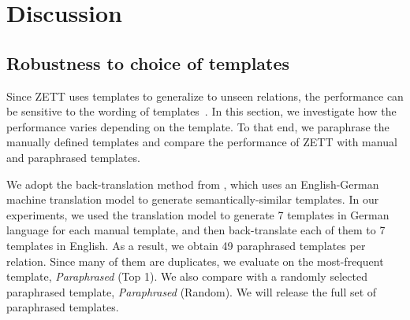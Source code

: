 \section{Discussion} \label{sec:analysis}

\subsection{Robustness to choice of templates}
Since ZETT uses templates to generalize to unseen relations, the performance can be sensitive to the
wording of templates~\cite{sanh2022multitask}. In this section, we investigate how the performance varies depending on the template.
{To that end, we paraphrase the manually defined templates and compare the performance of ZETT with manual and paraphrased templates.}

We adopt the back-translation method from \citet{jiang-etal-2020-know}, which uses an English-German machine translation model to generate semantically-similar templates. {In our experiments, we used the translation model to generate 7 templates in German language for each manual template, and then back-translate each of them to 7 templates in English. As a result, we obtain 49 paraphrased templates per relation. Since many of them are duplicates, we evaluate on the most-frequent template, \textit{Paraphrased} (Top 1). We also compare with a randomly selected paraphrased template, \textit{Paraphrased} (Random). We will release the full set of paraphrased templates.}

